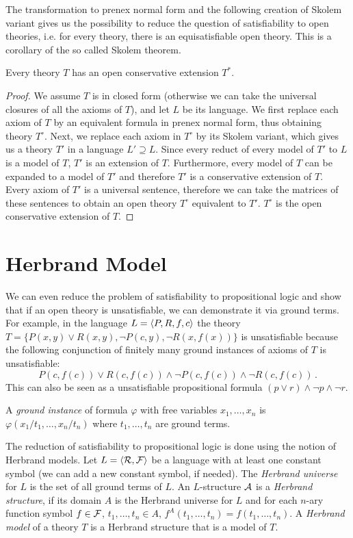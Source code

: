 The transformation to prenex normal form and the following creation of Skolem variant gives us the possibility to reduce the question of satisfiability to open theories, i.e. for every theory, there is an equisatisfiable open theory. This is a corollary of the so called Skolem theorem.

\begin{theorem}[Skolem]
Every theory $T$ has an open conservative extension $T^*$.
\end{theorem}
\begin{proof}
We assume $T$ is in closed form (otherwise we can take the universal closures of all the axioms of $T$), and let $L$ be its language. We first replace each axiom of $T$ by an equivalent formula in prenex normal form, thus obtaining theory $T^\circ$. Next, we replace each axiom in $T^\circ$ by its Skolem variant, which gives us a theory $T'$ in a language $L' \supseteq L$. Since every reduct of every model of $T'$ to $L$ is a model of $T$, $T'$ is an extension of $T$. Furthermore, every model of $T$ can be expanded to a model of $T'$ and therefore $T'$ is a conservative extension of $T$. Every axiom of $T'$ is a universal sentence, therefore we can take the matrices of these sentences to obtain an open theory $T^\circ$ equivalent to $T'$. $T^\circ$ is the open conservative extension of $T$.
\end{proof}

\section{Herbrand Model}

We can even reduce the problem of satisfiability to propositional logic and show that if an open theory is unsatisfiable, we can demonstrate it via ground terms. For example, in the language $L = \langle P, R, f, c \rangle$ the theory $T=\{P(x,y) \lor R(x,y), \neg P(c,y), \neg R(x, f(x))\}$ is unsatisfiable because the following conjunction of finitely many ground instances of axioms of $T$ is unsatisfiable: $$P(c, f(c)) \lor R(c, f(c)) \land \neg P(c, f(c)) \land \neg R(c, f(c))\,.$$ This can also be seen as a unsatisfiable propositional formula $(p \lor r) \land \neg p \land \neg r$.

A \emph{ground instance} of formula $\varphi$ with free variables $x_1, \dots, x_n$ is $\varphi(x_1/t_1, \dots, x_n/t_n)$ where $t_1, \dots, t_n$ are ground terms.

The reduction of satisfiability to propositional logic is done using the notion of Herbrand models. Let $L = \langle \mathcal{R}, \mathcal{F} \rangle$ be a language with at least one constant symbol (we can add a new constant symbol, if needed). The \emph{Herbrand universe} for $L$ is the set of all ground terms of $L$. An $L$-structure $\mathcal{A}$ is a \emph{Herbrand structure}, if its domain $A$ is the Herbrand universe for $L$ and for each $n$-ary function symbol $f \in \mathcal{F}$, $t_1, \dots, t_n \in A$, $f^A(t_1, \dots, t_n) = f(t_1, \dots, t_n)$. A \emph{Herbrand model} of a theory $T$ is a Herbrand structure that is a model of $T$.

